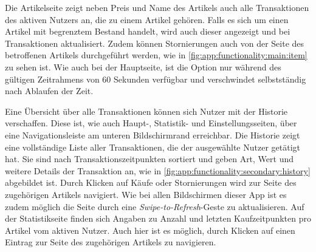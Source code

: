 Die Artikelseite zeigt neben Preis und Name des Artikels auch alle Transaktionen des aktiven Nutzers an, die zu einem Artikel gehören.
Falls es sich um einen Artikel mit begrenztem Bestand handelt, wird auch dieser angezeigt und bei Transaktionen aktualisiert.
Zudem können Stornierungen auch von der Seite des betroffenen Artikels durchgeführt werden, wie in \autoref{fig:app:functionality:main:item} zu sehen ist.
Wie auch bei der Hauptseite, ist die Option nur während des gültigen Zeitrahmens von 60 Sekunden verfügbar und verschwindet selbstständig nach Ablaufen der Zeit.

Eine Übersicht über alle Transaktionen können sich Nutzer mit der Historie verschaffen.
Diese ist, wie auch Haupt-, Statistik- und Einstellungsseiten, über eine Navigationsleiste am unteren Bildschirmrand erreichbar.
Die Historie zeigt eine vollständige Liste aller Transaktionen, die der ausgewählte Nutzer getätigt hat.
Sie sind nach Transaktionszeitpunkten sortiert und geben Art, Wert und weitere Details der Transaktion an, wie in \autoref{fig:app:functionality:secondary:history} abgebildet ist.
Durch Klicken auf Käufe oder Stornierungen wird zur Seite des zugehörigen Artikels navigiert.
Wie bei allen Bildschirmen dieser App ist es zudem möglich die Seite durch eine \textit{Swipe-to-Refresh}-Geste zu aktualisieren.
Auf der Statistikseite finden sich Angaben zu Anzahl und letzten Kaufzeitpunkten pro Artikel vom aktiven Nutzer.
Auch hier ist es möglich, durch Klicken auf einen Eintrag zur Seite des zugehörigen Artikels zu navigieren.

